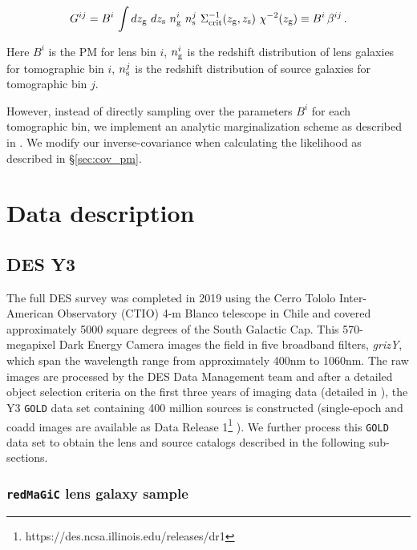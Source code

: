 \documentclass[aps, prd,twocolumn,superscriptaddress,nofootinbib,preprintnumbers]{revtex4-1}
\newcommand{\redmagic}{\texttt{redMaGiC} }
\newcommand{\gold}{\texttt{GOLD} }
\begin{document}
\begin{linenomath*}
\begin{equation}\label{eq:pm_Cij}
    G^{ij} = B^i \, \int dz_{\rm g} \ dz_{\rm s} \ n^{i}_{{\rm g}} \ n^{j}_{{\rm s}} \ \Sigma^{-1}_{\rm crit}(z_{\rm g},z_{\rm s}) \ \chi^{-2}(z_{\rm g}) \equiv B^i \, \beta^{ij} \,.
\end{equation}
\end{linenomath*}
Here $B^i$ is the PM for lens bin $i$, $n^{i}_{{\rm g}}$ is the redshift distribution of lens galaxies for tomographic bin $i$, $n^{j}_{{\rm s}}$ is the redshift distribution of source galaxies for tomographic bin $j$. 

However, instead of directly sampling over the parameters $B^i$ for each tomographic bin, we implement an analytic marginalization scheme as described in \cite{MacCrann:2019ntb}. We modify our inverse-covariance when calculating the likelihood as described in \S\ref{sec:cov_pm}.

    

\section{Data description}
\label{sec:data}
\subsection{DES Y3}

The full DES survey was completed in 2019 using the Cerro Tololo Inter-American Observatory (CTIO) 4-m Blanco telescope in Chile and covered approximately 5000 square degrees of the South Galactic Cap. This 570-megapixel Dark Energy Camera \citep{Flaugher15} images the field in five broadband filters, \textit{grizY}, which span the wavelength range from approximately 400nm to 1060nm. The raw images are processed by the DES Data Management team \citep{Sevilla11, Morganson18} and after a detailed object selection criteria on the first three years of imaging data (detailed in \citet*{Abbott_2018}), the Y3 \gold data set containing 400 million sources is constructed (single-epoch and coadd images are available as Data Release 1\footnote{https://des.ncsa.illinois.edu/releases/dr1} ). We further process this \gold data set to obtain the lens and source catalogs described in the following sub-sections.


\subsubsection{\redmagic lens galaxy sample}
\end{document}
